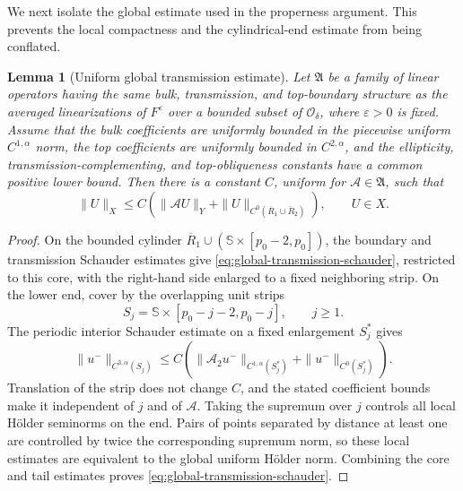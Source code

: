 \documentclass[11pt,reqno]{amsart}
\numberwithin{equation}{section}
\newtheorem{lemma}[theorem]{Lemma}
\theoremstyle{definition}
\theoremstyle{remark}
\begin{document}
We next isolate the global estimate used in the properness argument.
This prevents the local compactness and the cylindrical-end estimate
from being conflated.

\begin{lemma}[Uniform global transmission estimate]
\label{lem:global-schauder-fixed-eps}
Let $\mathfrak A$ be a family of linear operators having the same
bulk, transmission, and top-boundary structure as the averaged
linearizations of $F^\varepsilon$ over a bounded subset of
$\mathcal O_\delta$, where $\varepsilon>0$ is fixed.  Assume that the
bulk coefficients are uniformly bounded in the piecewise uniform
$C^{1,\alpha}$ norm, the top coefficients are uniformly bounded in
$C^{2,\alpha}$, and the ellipticity, transmission-complementing, and
top-obliqueness constants have a common positive lower bound.  Then
there is a constant $C$, uniform for $\mathscr A\in\mathfrak A$, such
that
\begin{equation}\label{eq:global-transmission-schauder}
 \|U\|_X\le C\left(
  \|\mathscr A U\|_Y+\|U\|_{C^0(\overline R_1\cup\overline R_2)}
 \right),\qquad U\in X.
\end{equation}
\end{lemma}
\begin{proof}
On the bounded cylinder
$\overline R_1\cup(\mathbb S\times[p_0-2,p_0])$, the boundary and
transmission Schauder estimates \cite{Agmon,Lady} give
\eqref{eq:global-transmission-schauder}, restricted to this core,
with the right-hand side enlarged to a fixed neighboring strip.  On
the lower end, cover by the overlapping unit strips
\[
 S_j=\mathbb S\times[p_0-j-2,p_0-j],\qquad j\ge1.
\]
The periodic interior Schauder estimate on a fixed enlargement
$S_j^*$ gives
\[
 \|u^-\|_{C^{3,\alpha}(S_j)}
 \le C\left(
  \|\mathscr A_2u^-\|_{C^{1,\alpha}(S_j^*)}
  +\|u^-\|_{C^0(S_j^*)}
 \right).
\]
Translation of the strip does not change $C$, and the stated
coefficient bounds make it independent of $j$ and of
$\mathscr A$.  Taking the supremum over $j$ controls all local
H\"older seminorms on the end.  Pairs of points separated by distance
at least one are controlled by twice the corresponding supremum
norm, so these local estimates are equivalent to the global uniform
H\"older norm.  Combining the core and tail estimates proves
\eqref{eq:global-transmission-schauder}.
\end{proof}
\end{document}
